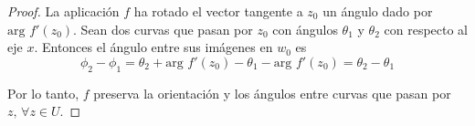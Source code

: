 \begin{proof}
La aplicación $f$ ha rotado el vector tangente a $z_0$ un ángulo dado por $\text{arg } f'(z_0)$. Sean dos curvas que pasan por $z_0$ con ángulos $\theta_1$ y $\theta_2$ con respecto al eje $x$. Entonces el ángulo entre sus imágenes en $w_0$ es 
\begin{equation*}
\phi_2 - \phi_1 = \theta_2 + \text{arg } f'(z_0) - \theta_1 - \text{arg } f'(z_0) = \theta_2 - \theta_1
\end{equation*}

Por lo tanto, $f$ preserva la orientación y los ángulos entre curvas que pasan por $z, \, \forall z \in U$.

\begin{comment}
$(\Rightarrow)$ Supongamos que $f$ es conforme y que $\frac{\partial f}{\partial x}$ y $\frac{\partial f}{\partial y}$ son continuas. En este caso tenemos
\begin{equation*}
w'(t_0) = \dfrac{\partial f}{\partial x} x'(t_0) +  \dfrac{\partial f}{\partial y} y'(t_0)
\end{equation*}

Podemos reescribir esto de la siguiente manera
\begin{equation*}
w'(t_0) = \dfrac{1}{2} \left( \dfrac{\partial f}{\partial x} - i\dfrac{\partial f}{\partial y} \right) z'(t_0) + \dfrac{1}{2} \left( \dfrac{\partial f}{\partial x} + i\dfrac{\partial f}{\partial y} \right) \xbar{z'(t_0)}
\end{equation*}

Si los ángulos se preservan entonces $\arg{(w'(t_0/z'(t_0)))}$ es independiente de $z'(t_0)$. Así,
\begin{equation*}
\dfrac{1}{2} \left( \dfrac{\partial f}{\partial x} - i\dfrac{\partial f}{\partial y} \right) + \dfrac{1}{2} \left( \dfrac{\partial f}{\partial x} + i\dfrac{\partial f}{\partial y} \right) \left( \dfrac{\xbar{z'(t_0)}}{z'(t_0)} \right)
\end{equation*}
tiene argumento constante.

Supongamos que $z'(t_0) = re^{i \theta}$. Entonces
\begin{equation*}
\dfrac{\xbar{z'(t_0)}}{z'(t_0)} = \dfrac{re^{-i \theta}}{re^{i \theta}} = e^{-2i \theta}
\end{equation*}

Mientras $z'(t_0)$ varía, la curva describe una circunferencia de radio $\frac{1}{2} \abs{\frac{\partial f}{\partial x} - i\frac{\partial f}{\partial y}}$. El argumento solo puede ser constante si $\frac{\partial f}{\partial x} - i\frac{\partial f}{\partial y}$ es cero. Como hemos visto, estas ecuaciones implican que es holomorfa.
\end{comment}
\end{proof}

